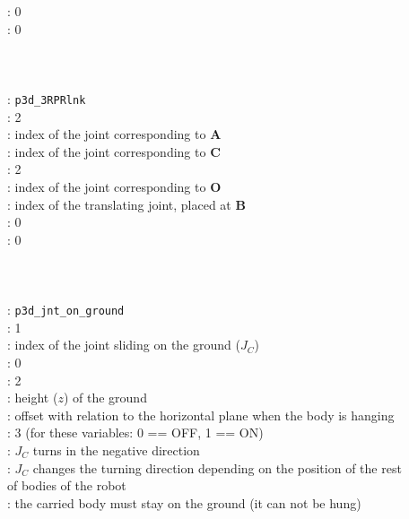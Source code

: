 \begin{tabbing}
\> \>: 0\\
\> \>: 0\\
\>\>\\
 \\
\>\>\\
\> \>: {\tt p3d\_3RPRlnk}\\
\> \>: 2\\
\> \>: index of the joint corresponding to {\bf A}\\
\> \>: index of the joint corresponding to {\bf C}\\
\> \>: 2\\
\> \>: index of the joint corresponding to {\bf O}\\
\> \>: index of the translating joint, placed at {\bf B}\\
\> \>: 0\\
\> \>: 0\\
\>\>\\
 \\
\>\>\\
\> \>: {\tt p3d\_jnt\_on\_ground}\\
\> \>: 1\\
\> \>: index of the joint sliding on the ground ($J_C$)\\
\> \>: 0\\
\> \>: 2\\
\> \>: height ($z$) of the ground\\
\> \>: offset with relation to the horizontal plane
when the body is hanging\\
\> \>: 3  (for these variables: 0 == OFF, 1 == ON)\\
\> \>: $J_C$ turns in the negative direction\\
\> \>: $J_C$ changes the turning direction depending on
the position of the rest\\\>\>\>\> of bodies of the robot\\
\> \>: the carried body must stay on the ground (it can
not be hung)\\
\>\>\\
 \\
\>\>\\

\end{tabbing}
